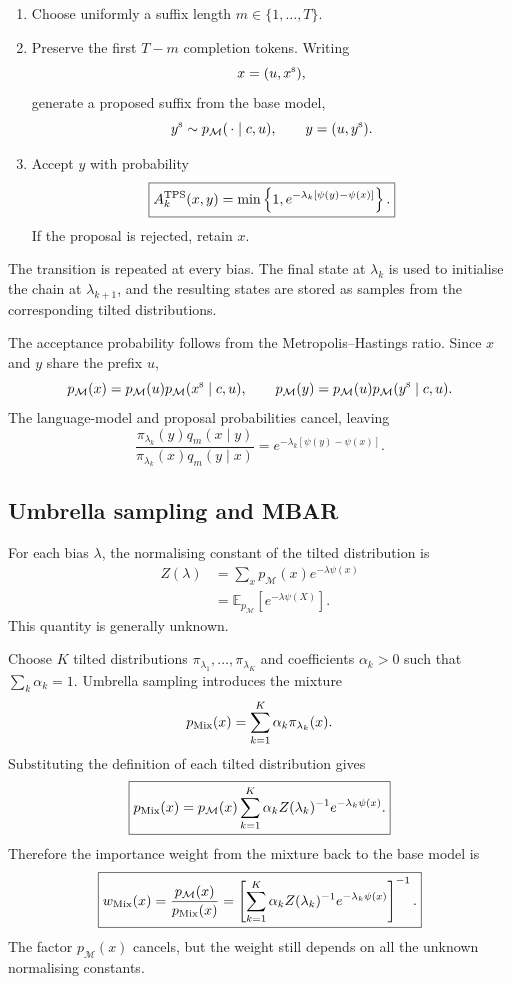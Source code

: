 \documentclass[11pt,a4paper]{article}
\newcommand{\pM}{p_{\mathcal M}}
\newcommand{\E}{\mathbb E}
\newcommand{\1}{\mathbb I}
\begin{document}
\begin{enumerate}[label=\arabic*.]
    \item Choose uniformly a suffix length $m\in\{1,\ldots,T\}$.

    \item Preserve the first $T-m$ completion tokens. Writing
    \[
    x=(u,x^{\rm s}),
    \]
    generate a proposed suffix from the base model,
    \[
    y^{\rm s}\sim\pM(\,\cdot\mid c,u),
    \qquad
    y=(u,y^{\rm s}).
    \]

    \item Accept $y$ with probability
    \[
    \boxed{
    A_k^{\rm TPS}(x,y)
    =
    \min\left\{
    1,
    e^{-\lambda_k[\psi(y)-\psi(x)]}
    \right\}.}
    \]
    If the proposal is rejected, retain $x$.
\end{enumerate}

The transition is repeated at every bias. The final state at $\lambda_k$ is
used to initialise the chain at $\lambda_{k+1}$, and the resulting states are
stored as samples from the corresponding tilted distributions.

The acceptance probability follows from the Metropolis--Hastings ratio. Since
$x$ and $y$ share the prefix $u$,
\[
\pM(x)=\pM(u)\pM(x^{\rm s}\mid c,u),
\qquad
\pM(y)=\pM(u)\pM(y^{\rm s}\mid c,u).
\]
The language-model and proposal probabilities cancel, leaving
\[
\frac{
\pi_{\lambda_k}(y)q_m(x\mid y)
}{
\pi_{\lambda_k}(x)q_m(y\mid x)
}
=
e^{-\lambda_k[\psi(y)-\psi(x)]}.
\]

\subsection{Umbrella sampling and MBAR}

For each bias $\lambda$, the normalising constant of the tilted distribution
is
\begin{align*}
Z(\lambda)
&=
\sum_x \pM(x)e^{-\lambda\psi(x)}\\
&=
\E_{\pM}\!\left[e^{-\lambda\psi(X)}\right].
\end{align*}
This quantity is generally unknown.

Choose $K$ tilted distributions $\pi_{\lambda_1},\ldots,
\pi_{\lambda_K}$ and coefficients $\alpha_k>0$ such that
$\sum_k\alpha_k=1$. Umbrella sampling introduces the mixture
\[
p_{\rm Mix}(x)
=
\sum_{k=1}^{K}\alpha_k\pi_{\lambda_k}(x).
\]
Substituting the definition of each tilted distribution gives
\[
\boxed{
p_{\rm Mix}(x)
=
\pM(x)
\sum_{k=1}^{K}
\alpha_k Z(\lambda_k)^{-1}e^{-\lambda_k\psi(x)}.}
\]
Therefore the importance weight from the mixture back to the base model is
\[
\boxed{
w_{\rm Mix}(x)
=
\frac{\pM(x)}{p_{\rm Mix}(x)}
=
\left[
\sum_{k=1}^{K}
\alpha_k Z(\lambda_k)^{-1}e^{-\lambda_k\psi(x)}
\right]^{-1}.}
\]
The factor $\pM(x)$ cancels, but the weight still depends on all the unknown
normalising constants.
\end{document}
